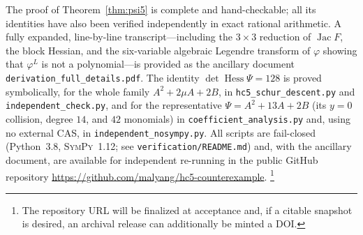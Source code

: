 \documentclass[11pt]{article}
\theoremstyle{plain}
\theoremstyle{definition}
\newcommand{\Hess}{\operatorname{Hess}}
\newcommand{\Jac}{\operatorname{Jac}}
\begin{document}
The proof of Theorem~\ref{thm:psi5} is complete and hand-checkable; all
its identities have also been verified independently in exact rational
arithmetic. A fully expanded, line-by-line transcript---including the
$3\times3$ reduction of $\Jac F$, the block Hessian, and the six-variable
algebraic Legendre transform of $\varphi$ showing that $\varphi^{L}$ is
not a polynomial---is provided as the ancillary document
\texttt{derivation\_full\_details.pdf}. The identity
$\det\Hess\Psi=128$ is proved symbolically, for the whole
family $A^2+2\mu A+2B$, in \texttt{hc5\_schur\_descent.py} and
\texttt{independent\_check.py}, and for the representative
$\Psi=A^2+13A+2B$ (its $y=0$ collision, degree $14$, and $42$
monomials) in \texttt{coefficient\_analysis.py} and, using no external
CAS, in \texttt{independent\_nosympy.py}. All scripts are fail-closed
(Python~3.8, \textsc{SymPy}~1.12; see \texttt{verification/README.md})
and, with the ancillary document, are available for independent
re-running in the public GitHub repository
\url{https://github.com/malyang/hc5-counterexample}.%
\footnote{The repository URL will be finalized at acceptance and, if a
citable snapshot is desired, an archival release can additionally be
minted a DOI.}
\end{document}
